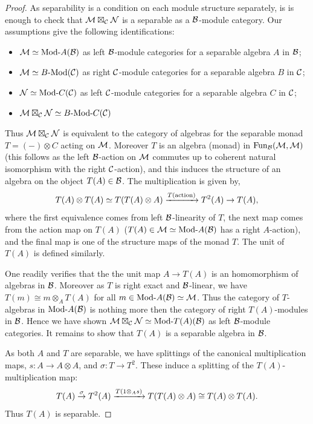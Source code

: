 \documentclass{amsart}
\begin{document}
\begin{proof}
	As separability is a condition on each module structure separately, is is enough to check that $\mathcal M \boxtimes_{\mathcal C} \mathcal N$ is a separable as a $\mathcal B$-module category. Our assumptions give the following identifications:
\begin{itemize}
	\item $\cM \simeq \Mod{}{A}(\cB)$ as left $\mathcal B$-module categories for a separable algebra $A$ in $\mathcal B$;
	\item $\cM \simeq \Mod{B}{}(\cC)$ as right $\mathcal C$-module categories for a separable algebra $B$ in $\mathcal C$;
	\item $\cN \simeq \Mod{}{C}(\cC)$ as left $\mathcal C$-module categories for a separable algebra $C$ in $\mathcal C$;
	\item $\cM \boxtimes_{\cC} \cN \simeq \Mod{B}{C}(\cC)$
\end{itemize}
Thus $\mathcal M \boxtimes_{\mathcal C} \mathcal N$ is equivalent to the category of algebras for the separable monad $T = (-) \otimes C$ acting on $\mathcal M$. Moreover $T$ is an algebra (monad) in $\operatorname{Fun}_{\mathcal B}(\mathcal M, \mathcal M)$ (this follows as the left $\mathcal B$-action on $\mathcal M$ commutes up to coherent natural isomorphism with the right $\mathcal C$-action), and this induces the structure of an algebra on the object $T(A) \in \mathcal B$. The multiplication is given by,
\begin{equation*}
	T(A) \otimes T(A)  \simeq T( T(A) \otimes A)  \xrightarrow{T(\textrm{action})} T^2(A) \to T(A),
\end{equation*}
where the first equivalence comes from left $\mathcal B$-linearity of $T$, the next map comes from the action map on $T(A)$ ($T(A) \in \cM \simeq \Mod{}{A}(\cB)$ has a right $A$-action), and the final map is one of the structure maps of the monad $T$. The unit of $T(A)$ is defined similarly. 

One readily verifies that the the unit map $A \to T(A)$ is an homomorphism of algebras in $\mathcal B$. Moreover as $T$ is right exact and $\mathcal B$-linear, we have $T(m) \cong m \otimes_A T(A)$ for all $m \in \Mod{}{A}(\cB) \simeq \cM$. Thus the category of $T$-algebras in $\Mod{}{A}(\cB)$ is nothing more then the category of right $T(A)$-modules in $\mathcal B$.  Hence we have shown $\cM \boxtimes_{\cC} \cN \simeq \Mod{}{T(A)}(\cB)$ as left $\mathcal B$-module categories. It remains to show that $T(A)$ is a separable algebra in $\mathcal B$.

As both $A$ and $T$ are separable, we have splittings of the canonical multiplication maps, $s: A  \to A \otimes A$, and $\sigma:T \to T^2$. These induce a splitting of the $T(A)$-multiplication map:
\begin{equation*}
	T(A) \stackrel{\sigma}{\to} T^2(A) \xrightarrow{T(1 \otimes_A s)} T( T(A) \otimes A) \cong T(A) \otimes T(A).
\end{equation*}
Thus $T(A)$ is separable.
\end{proof}
\end{document}
